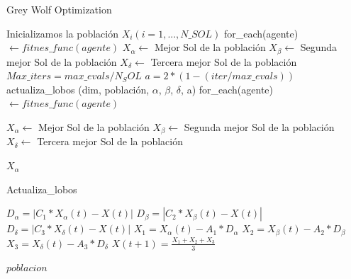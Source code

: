 \documentclass[a4paper]{report}
\begin{document}
\begin{algorithm}[H]
    \caption{Grey Wolf Optimization}\label{alg:GWO}
    \begin{algorithmic}[1]
        \State Inicializamos la población $X_i (i=1,...,N\_SOL)$
        \State for\_each(agente) $ \gets fitnes\_func(agente)$
        \State $X_\alpha \gets$ Mejor Sol de la población
        \State $X_\beta \gets$ Segunda mejor Sol de la población
        \State $X_\delta \gets$ Tercera mejor Sol de la población
        \State $Max\_iters=max\_evals/N_SOL$
        \State $a=2*(1-(iter/max\_evals))$
        \State actualiza\_lobos (dim, población, $\alpha$, $\beta$, $\delta$, a)
        \State for\_each(agente) $ \gets fitnes\_func(agente)$

        \State $X_\alpha \gets$ Mejor Sol de la población
        \State $X_\beta \gets$ Segunda mejor Sol de la población
        \State $X_\delta \gets$ Tercera mejor Sol de la población


        \EndFor

        \Return $X_\alpha $
        \EndFunction


    \end{algorithmic}
\end{algorithm}


\begin{algorithm}[H]
    \caption{Actualiza\_lobos}\label{alg:AW}
    \begin{algorithmic}[1]

        \State $D_\alpha=|C_1*X_\alpha(t)-X(t)| $
        \State $D_\beta=|C_2*X_\beta(t)-X(t)| $
        \State $D_\delta=|C_3*X_\delta(t)-X(t)| $
        \State $X_1=X_\alpha(t)-A_1*D_\alpha$
        \State $X_2=X_\beta(t)-A_2*D_\beta$
        \State $X_3=X_\delta(t)-A_3*D_\delta$
        \State $X(t+1)=\frac{X_1+X_2+X_3}{3}$ 

        \EndFor

        \Return $poblacion$
        \EndFunction


    \end{algorithmic}
\end{algorithm}
\end{document}
